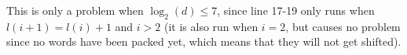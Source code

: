 This is only a problem when $\log_2(d) \leq 7$, since line 17-19 only runs when $l(i + 1) = l(i) + 1$ and $i > 2$ (it is also run when $i=2$, but causes no problem since no words have been packed yet, which means that they will not get shifted).
